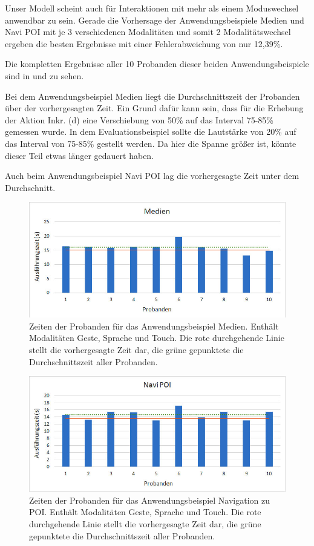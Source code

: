 Unser Modell scheint auch für Interaktionen mit mehr als einem Moduswechsel anwendbar zu sein. Gerade die Vorhersage der Anwendungsbeispiele Medien und Navi POI mit je 3 verschiedenen Modalitäten und somit 2 Modalitätswechsel ergeben die besten Ergebnisse mit einer Fehlerabweichung von nur 12,39\%. 

Die kompletten Ergebnisse aller 10 Probanden dieser beiden Anwendungsbeispiele sind in  und  zu sehen. 

Bei dem Anwendungsbeispiel Medien liegt die Durchschnittszeit der Probanden über der vorhergesagten Zeit. Ein Grund dafür kann sein, dass für die Erhebung der Aktion Inkr. (d) eine Verschiebung von 50\% auf das Interval 75-85\% gemessen wurde. In dem Evaluationsbeispiel sollte die Lautstärke von 20\% auf das Interval von 75-85\% gestellt werden. Da hier die Spanne größer ist, könnte dieser Teil etwas länger gedauert haben. 

Auch beim Anwendungsbeispiel Navi POI lag die vorhergesagte Zeit unter dem Durchschnitt. 
\begin{figure}
			\centering
			\includegraphics[width=1\textwidth]{img/Medien_Times.jpg}
			\caption[Zeiten der Probanden für das Anwendungsbeispiel Medien.]{Zeiten der Probanden für das Anwendungsbeispiel Medien. Enthält Modalitäten Geste, Sprache und Touch. Die rote durchgehende Linie stellt die vorhergesagte Zeit dar, die grüne gepunktete die Durchschnittszeit aller Probanden.}
			\label{fig:Medien_Times}
\end{figure}
\begin{figure}
			\centering
			\includegraphics[width=1\textwidth]{img/Navi_POI_Times.jpg}
			\caption[Zeiten der Probanden für das Anwendungsbeispiel Navigation zu POI.]{Zeiten der Probanden für das Anwendungsbeispiel Navigation zu POI. Enthält Modalitäten Geste, Sprache und Touch. Die rote durchgehende Linie stellt die vorhergesagte Zeit dar, die grüne gepunktete die Durchschnittszeit aller Probanden.}
			\label{fig:Navi_POI_Times}		
\end{figure}


